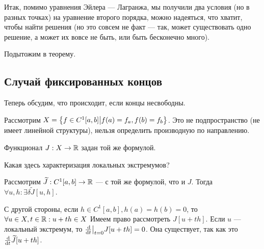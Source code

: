 \documentclass[a4paper]{article}
\begin{document}
    Итак, помимо уравнения Эйлера --- Лагранжа, мы получили два условия (но в разных точках) на уравнение второго порядка, можно надеяться, что хватит, чтобы найти решения (но это совсем не факт --- так, может существовать одно решение, а может их вовсе не быть, или быть бесконечно много).

    Подытожим в теорему.
    \subsection{Случай фиксированных концов}
    Теперь обсудим, что происходит, если концы несвободны.

    Рассмотрим $X = \left\{f \in C^1[a, b]\middle|f(a) = f_a, f(b) = f_b\right\}$.
    Это не подпространство (не имеет линейной структуры), нельзя определить производную по направлению.

    Функционал $J: X \rightarrow \mathbb{R}$ задан той же формулой.

    Какая здесь характеризация локальных экстремумов?

    Рассмотрим $\widetilde{J}: C^1[a, b] \rightarrow \mathbb{R}$ --- с той же формулой, что и $J$.
    Тогда $\forall u, h: \exists \delta\tilde{J}[u, h]$.

    С другой стороны, если $h \in C^1[a, b], h(a) = h(b) = 0$, то $\forall u \in X, t \in \mathbb{R}: u + th \in X$
    Имеем право рассмотреть $J[u + th]$. Если $u$ --- локальный экстремум, то $\frac{\operatorname{d}\! }{\operatorname{d}\! t}\big|_{t = 0}J[u + th] = 0$.
    Она существует, так как это $\frac{\operatorname{d}\!}{\operatorname{d}\! t}\widetilde{J}[u + th]$.
\end{document}
